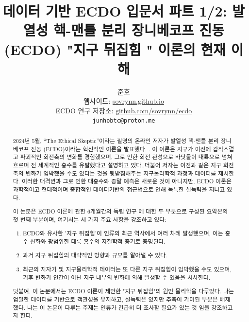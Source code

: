 \documentclass[10pt,twocolumn,letterpaper]{article}
\begin{document}
\title{ 데이터 기반 ECDO 입문서 파트 1/2: 발열성 핵-맨틀 분리 장니베코프 진동 (ECDO) "지구 뒤집힘 " 이론의 현재 이해}

\author{준호\\
웹사이트: \href{https://sovrynn.github.io}{sovrynn.github.io}\\
ECDO 연구 저장소: \href{https://github.com/sovrynn/ecdo}{github.com/sovrynn/ecdo}\\
{\tt\small junhobtc@proton.me}
}

\maketitle

\begin{abstract}
2024년 5월, “The Ethical Skeptic”이라는 필명의 온라인 저자가 발열성 핵-맨틀 분리 장니베코프 진동 (ECDO)이라는 혁신적인 이론을 발표했다. \cite{0}. 이 이론은 지구가 이전에 갑작스럽고 파괴적인 회전축의 변화를 경험했으며, 그로 인한 회전 관성으로 바닷물이 대륙으로 넘쳐흐르며 전 세계적인 홍수를 유발했다고 설명하고 있다.\cite{1}.더불어 저자는 이전과 같은 지구 회전축의 변화가 임박했을 수도 있다는 것을 뒷받침해주는 지구물리학적 과정과 데이터를 제시한다. 이러한 대격변과 그로 인한 대홍수와 종말 예측은 새로운 것이 아니지만, ECDO 이론은 과학적이고 현대적이며 종합적인 데이터기반의 접근법으로 인해  독특한 설득력을 지니고 있다. 

이 논문은 ECDO 이론에 관한 6개월간의 독립 연구 \cite{2,20}에 대한 두 부분으로 구성된 요약본의 첫 번째 부분이며, 여기서는 세 가지 주요 사항을 강조하고 있다:

\begin{flushleft}
\begin{enumerate}
    \item ECDO와 유사한 '지구 뒤집힘'이 인류의 최근 역사에서 여러 차례 발생했으며, 이는 홍수 신화와 광범위한 대륙 홍수의 지질학적 증거로 증명된다.
    \item 과거 지구 뒤집힘의 대략적인 방향과 규모를  알아낼 수 있다.
    \item 최근의 지자기 및 지구물리학적 데이터는 또 다른 지구 뒤집힘이 임박했을 수도 있으며, 기후 변화가 인간이 아닌 지구 내부의 변화에 의해 발생할 수 있음을 시사한다.
\end{enumerate}
\end{flushleft}

 덧붙여, 이 논문에서는 ECDO 이론이 제안한 "지구 뒤집힘"의 원인 물리학을 다루었다.
나는 엄밀한 데이터를 기반으로 객관성을 유지하고, 설득력은 있지만 추측이 가미된 부분은 배제했다. 나는 이 논문이 다루는 주제는 인류가 긴급히 더 조사할 필요가 있는 것 임을 강조하고자 한다.
\end{abstract}
\end{document}
